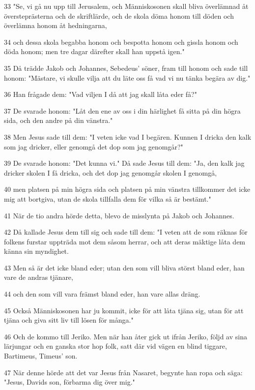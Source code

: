 \par 33 "Se, vi gå nu upp till Jerusalem, och Människosonen skall bliva överlämnad åt översteprästerna och de skriftlärde, och de skola döma honom till döden och överlämna honom åt hedningarna,
\par 34 och dessa skola begabba honom och bespotta honom och gissla honom och döda honom; men tre dagar därefter skall han uppstå igen."
\par 35 Då trädde Jakob och Johannes, Sebedeus' söner, fram till honom och sade till honom: "Mästare, vi skulle vilja att du läte oss få vad vi nu tänka begära av dig."
\par 36 Han frågade dem: "Vad viljen I då att jag skall låta eder få?"
\par 37 De svarade honom: "Låt den ene av oss i din härlighet få sitta på din högra sida, och den andre på din vänstra."
\par 38 Men Jesus sade till dem: "I veten icke vad I begären. Kunnen I dricka den kalk som jag dricker, eller genomgå det dop som jag genomgår?"
\par 39 De svarade honom: "Det kunna vi." Då sade Jesus till dem: "Ja, den kalk jag dricker skolen I få dricka, och det dop jag genomgår skolen I genomgå,
\par 40 men platsen på min högra sida och platsen på min vänstra tillkommer det icke mig att bortgiva, utan de skola tillfalla dem för vilka så är bestämt."
\par 41 När de tio andra hörde detta, blevo de misslynta på Jakob och Johannes.
\par 42 Då kallade Jesus dem till sig och sade till dem: "I veten att de som räknas för folkens furstar uppträda mot dem såsom herrar, och att deras mäktige låta dem känna sin myndighet.
\par 43 Men så är det icke bland eder; utan den som vill bliva störst bland eder, han vare de andras tjänare,
\par 44 och den som vill vara främst bland eder, han vare allas dräng.
\par 45 Också Människosonen har ju kommit, icke för att låta tjäna sig, utan för att tjäna och giva sitt liv till lösen för många."
\par 46 Och de kommo till Jeriko. Men när han åter gick ut ifrån Jeriko, följd av sina lärjungar och en ganska stor hop folk, satt där vid vägen en blind tiggare, Bartimeus, Timeus' son.
\par 47 När denne hörde att det var Jesus från Nasaret, begynte han ropa och säga: "Jesus, Davids son, förbarma dig över mig."
